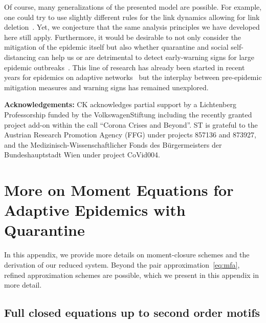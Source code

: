 \documentclass[12pt]{article}
\begin{document}
Of course, many generalizations of the presented model are possible. For example, one could try to use slightly different rules for the link dynamics allowing for link deletion~\cite{Balletal,TuncShkarayev}. Yet, we conjecture that the same analysis principles we have developed here still apply. Furthermore, it would be desirable to not only consider the mitigation of the epidemic itself but also whether quarantine and social self-distancing can help us or are detrimental to detect early-warning signs for large epidemic outbreaks~\cite{OReganDrake,WidderKuehn,Brettetal}. This line of research has already been started in recent years for epidemics on adaptive networks~\cite{KuehnZschalerGross,HorstmeyerKuehnThurner} but the interplay between pre-epidemic mitigation measures and warning signs has remained unexplored.\medskip 

\textbf{Acknowledgements:} CK acknowledges partial support by a Lichtenberg Professorship funded by the VolkswagenStiftung including the recently granted project add-on within the call ``Corona Crises and Beyond''. ST is grateful to the Austrian Research Promotion Agency (FFG) under projects 857136 and 873927, and the Medizinisch-Wissenschaftlicher Fonds des B\"urgermeisters der Bundeshauptstadt Wien under project CoVid004. 







\newpage
\appendix

\section{More on Moment Equations for Adaptive Epidemics with Quarantine}
\label{appendixA}

In this appendix, we provide more details on moment-closure schemes and the derivation of our reduced system. Beyond the pair approximation~\eqref{eq:mfa}, refined approximation schemes are possible, which we present in this appendix in more detail.

\subsection{Full closed equations up to second order motifs}
\end{document}
